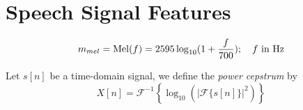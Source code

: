 \chapter{Speech Signal Features}
\label{chapter:speech-feature}

\begin{equation}
\label{eq:mel-function}
m_{mel} = \operatorname{Mel}(f) = 2595 \log_{10} (1 + \frac{f}{700}); \quad f \text{ in Hz}
\end{equation}

Let $s[n]$ be a time-domain signal, we define the \textit{power cepstrum} by
\begin{equation}
\label{eq:time-domain-to-cepstrum}
X[n] = \mathcal{F}^{-1} \left\{\log_{10} \left( |\mathcal{F}\{s[n]\}|^2 \right) \right\}
\end{equation}
